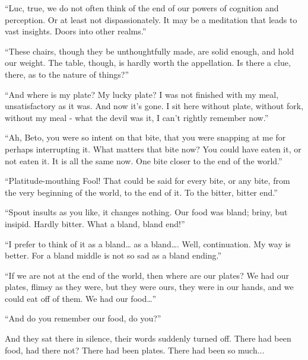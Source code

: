 ``Luc, true, we do not often think of the end of our powers of cognition
and perception. Or at least not dispassionately. It may be a meditation
that leads to vast insights. Doors into other realms.''

``These chairs, though they be unthoughtfully made, are solid enough,
and hold our weight. The table, though, is hardly worth the appellation.
Is there a clue, there, as to the nature of things?''

``And where is my plate? My lucky plate? I was not finished with my
meal, unsatisfactory as it was. And now it's gone. I sit here without
plate, without fork, without my meal - what the devil was it, I can't
rightly remember now.''

``Ah, Beto, you were so intent on that bite, that you were snapping at
me for perhaps interrupting it. What matters that bite now? You could
have eaten it, or not eaten it. It is all the same now. One bite closer
to the end of the world.''

``Platitude-mouthing Fool! That could be said for every bite, or any
bite, from the very beginning of the world, to the end of it. To the
bitter, bitter end.''

``Spout insults as you like, it changes nothing. Our food was bland;
briny, but insipid. Hardly bitter. What a bland, bland end!''

``I prefer to think of it as a bland\ldots{} as a bland\ldots{}. Well,
continuation. My way is better. For a bland middle is not so sad as a
bland ending.''

``If we are not at the end of the world, then where are our plates? We
had our plates, flimsy as they were, but they were ours, they were in
our hands, and we could eat off of them. We had our food\ldots{}''

``And do you remember our food, do you?''

And they sat there in silence, their words suddenly turned off. There
had been food, had there not? There had been plates. There had been so
much...
